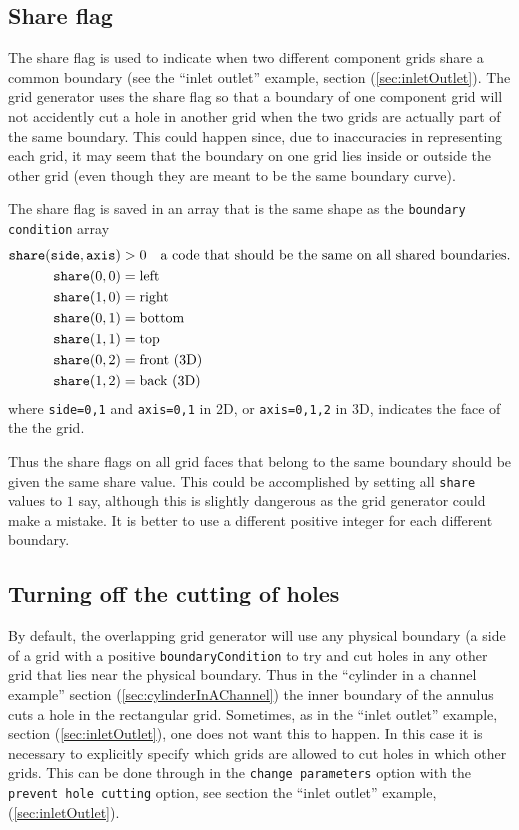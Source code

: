 \documentclass[xcolor=rgb,svgnames,dvipsnames]{article}
\newcommand{\Index}[1]{#1\index{#1}}
\begin{document}
\subsection{Share flag}\label{sec:share}

The \Index{share flag} is used to indicate when two different component grids share a common boundary (see
the ``inlet outlet'' example, section (\ref{sec:inletOutlet}). 
The grid generator uses the share flag so that a boundary of one
component grid will not accidently cut a hole in another grid when the two grids are actually part
of the same boundary. This could happen since, due to inaccuracies in representing each grid, it
may seem that the boundary on one grid lies inside or outside the other grid (even though they
are meant to be the same boundary curve).

The share flag is saved in an array that is the same shape as the {\tt boundary condition} array
\begin{align*}
{\tt share}({\tt side},{\tt axis}) 
            &> 0   \quad\text{a code that should be the same on all shared boundaries.} \\
 {\tt share}(0,0) &= \text{left} \\ 
 {\tt share}(1,0) &= \text{right} \\ 
 {\tt share}(0,1) &= \text{bottom} \\ 
 {\tt share}(1,1) &= \text{top} \\ 
 {\tt share}(0,2) &= \text{front (3D)} \\ 
 {\tt share}(1,2) &= \text{back (3D)} 
\end{align*}
where {\tt side=0,1} and {\tt axis=0,1} in 2D, or {\tt axis=0,1,2} in 3D, indicates the face of the the grid.

Thus the share flags on all grid faces that belong to the same boundary should be
given the same share value. This could be accomplished by setting all {\tt share} values to $1$ say,
although this is slightly dangerous as the grid generator could make a mistake. It is better
to use a different positive integer for each different boundary.


\subsection{Turning off the cutting of holes}\label{sec:cuttingHoles}

  By default, the overlapping grid generator will use any  physical boundary (a side of a grid
with a positive {\tt boundaryCondition} to try and cut holes in any other grid that lies near
the physical boundary. Thus in the ``cylinder in a channel example'' section (\ref{sec:cylinderInAChannel})
the inner boundary of the annulus cuts a hole in the rectangular grid. 
Sometimes, as in the ``inlet outlet'' example, section (\ref{sec:inletOutlet}),
one does not want this to happen. In this case it is necessary to explicitly specify which
grids are allowed to cut holes in which other grids. This can be done through in the 
{\tt change parameters} option with the {\tt prevent hole cutting} option, see
section the ``inlet outlet'' example, (\ref{sec:inletOutlet}).
\end{document}
